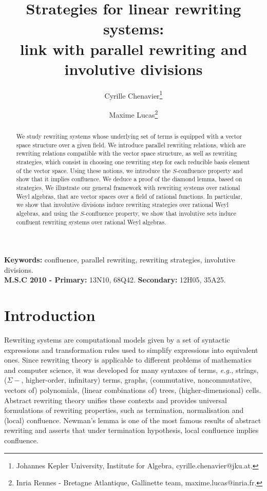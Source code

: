 \documentclass[11pt]{article}
\theoremstyle{definition}
\newcommand\eg{\emph{e.g.}}
\begin{document}
\title{Strategies for linear rewriting systems:\\[0.2cm]
 link with parallel rewriting and involutive divisions\vspace{0.5cm}}
\author{Cyrille Chenavier\footnote{
    Johannes Kepler University, Institute for Algebra,
    cyrille.chenavier@jku.at.
  }\and Maxime Lucas\footnote{Inria Rennes - Bretagne Atlantique,
    Gallinette team, maxime.lucas@inria.fr.}
  }
\date{}

\maketitle
      
\begin{abstract}
  We study rewriting systems whose underlying set of terms is equipped
  with a vector space structure over a given field. We introduce parallel
  rewriting relations, which are rewriting relations compatible with the
  vector space structure, as well as rewriting strategies, which consist
  in choosing one rewriting step for each reducible basis element of the
  vector space. Using these notions, we introduce the $S$-confluence
  property and show that it implies confluence. We deduce a proof of the
  diamond lemma, based on strategies. We illustrate our general framework
  with rewriting systems over rational Weyl algebras, that are vector
  spaces over a field of rational functions. In particular, we show that
  involutive divisions induce rewriting strategies over rational Weyl
  algebras, and using the $S$-confluence property, we show that
  involutive sets induce confluent rewriting systems over rational Weyl
  algebras.
\end{abstract}
\noindent
\begin{small}\textbf{Keywords:} confluence, parallel rewriting, rewriting
  strategies, involutive divisions.\\[0.2cm]
  \textbf{M.S.C 2010 - Primary:} 13N10, 68Q42. \textbf{Secondary:} 12H05,
  35A25.
\end{small}

\tableofcontents

\section{Introduction}

Rewriting systems are computational models given by a set of syntactic
expressions and transformation rules used to simplify expressions into
equivalent ones. Since rewriting theory is applicable to different
problems of mathematics and computer science, it was developed for many
syntaxes of terms, \eg, strings, ($\Sigma-$, higher-order, infinitary)
terms, graphs, (commutative, noncommutative, vectors of) polynomials,
(linear combinations of) trees, (higher-dimensional) cells. Abstract
rewriting theory unifies these contexts and provides universal
formulations of rewriting properties, such as termination, normalisation
and (local) confluence. Newman's lemma is one of the most famous results 
of abstract rewriting and asserts that under termination hypothesis, 
local confluence implies confluence.
\medskip
\end{document}
